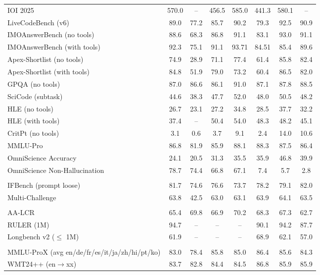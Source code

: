 \begin{table}[!t]
{\begin{tabular}{l|c c c c c c c}
\midrule
\rowcolor{black!5}
\multicolumn{8}{l}{\textbf{Reasoning and Knowledge}} \\
\midrule
IOI 2025 & 570.0 & -- & 456.5 & 585.0 & 441.3 & 580.1 & --\\
LiveCodeBench (v6) & 89.0 & 77.2 & 85.7 & 90.2 & 79.3 & 92.5 & 90.9 \\
IMOAnswerBench (no tools) & 88.6 & 68.3 & 86.8 & 91.1 & 83.1 & 93.0 & 91.1 \\
IMOAnswerBench (with tools) & 92.3 & 75.1 & 91.1 & 93.71 & 84.51 & 85.4 & 89.6 \\
Apex-Shortlist (no tools) & 74.9 & 28.9 & 71.1 & 77.4 & 61.4 & 85.8 & 82.4 \\
Apex-Shortlist (with tools) & 84.8 & 51.9 & 79.0 & 73.2 & 60.4 & 86.5 & 82.0 \\
GPQA (no tools) & 87.0 & 86.6 & 86.1 & 91.0 & 87.1 & 87.8 & 88.5 \\
SciCode (subtask) & 44.6 & 38.3 & 47.7 & 52.0 & 48.0 & 50.5 & 48.2 \\
HLE (no tools) & 26.7 & 23.1 & 27.2 & 34.8 & 28.5 & 37.7 & 32.2 \\
HLE (with tools) & 37.4 & -- & 50.4 & 54.0 & 48.3 & 48.2 & 45.1 \\
CritPt (no tools) & 3.1 & 0.6 & 3.7 & 9.1 & 2.4 & 14.0 & 10.6\\
MMLU-Pro & 86.8 & 81.9 & 85.9 & 88.1 & 88.3 & 87.5 & 86.4\\
OmniScience Accuracy & 24.1 & 20.5 & 31.3 & 35.5 & 35.9 & 46.8 & 39.9\\
OmniScience Non-Hallucination & 78.7 & 74.4 & 66.8 & 67.1 & 7.4 & 5.7 & 2.8\\

\midrule
\rowcolor{black!5}
\multicolumn{8}{l}{\textbf{Chat \& Instruction Following}} \\
\midrule
IFBench (prompt loose) & 81.7 & 74.6 & 76.6 & 73.7 & 78.2 & 79.1 & 82.0 \\
Multi-Challenge & 63.8 & 42.5 & 63.0 & 63.1 & 63.9 & 64.1 & 63.5\\
\midrule
\rowcolor{black!5}
\multicolumn{8}{l}{\textbf{Long Context}} \\
\midrule
AA-LCR & 65.4 & 69.8 & 66.9 & 70.2 & 68.3 & 67.3 & 62.7 \\
RULER (1M) & 94.7 & -- & -- & -- & 90.1 & 94.2 & 87.7 \\
Longbench v2 ($\leq$ 1M) & 61.9 & -- & -- & -- & 68.9 & 62.1 & 57.0 \\
\midrule
\rowcolor{black!5}
\multicolumn{8}{l}{\textbf{Multilingual}} \\
\midrule
MMLU-ProX (avg en/de/fr/es/it/ja/zh/hi/pt/ko) & 83.0 & 78.4 & 85.8 & 85.0 & 86.4 & 85.6 & 84.3\\
WMT24++ (en$\rightarrow$xx) & 83.7 & 82.8 & 84.4 & 84.5 & 86.8 & 85.9 & 85.9 \\


\end{tabular}}
\end{table}
